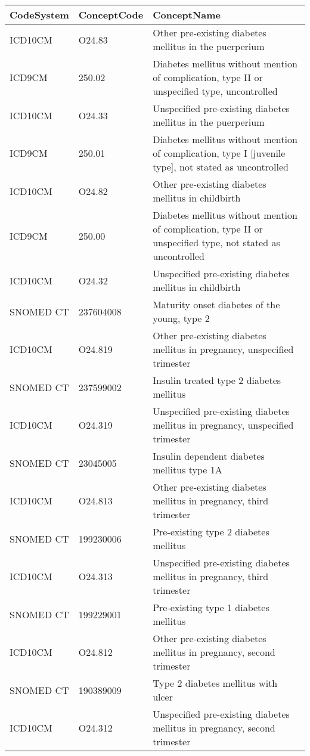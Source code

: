 \begin{table}[ht]
\centering
\begin{tabular}{lll}
  \hline
CodeSystem & ConceptCode & ConceptName \\ 
  \hline
ICD10CM & O24.83 & Other pre-existing diabetes mellitus in the puerperium \\ 
  ICD9CM & 250.02 & Diabetes mellitus without mention of complication, type II or unspecified type, uncontrolled \\ 
  ICD10CM & O24.33 & Unspecified pre-existing diabetes mellitus in the puerperium \\ 
  ICD9CM & 250.01 & Diabetes mellitus without mention of complication, type I [juvenile type], not stated as uncontrolled \\ 
  ICD10CM & O24.82 & Other pre-existing diabetes mellitus in childbirth \\ 
  ICD9CM & 250.00 & Diabetes mellitus without mention of complication, type II or unspecified type, not stated as uncontrolled \\ 
  ICD10CM & O24.32 & Unspecified pre-existing diabetes mellitus in childbirth \\ 
  SNOMED CT & 237604008 & Maturity onset diabetes of the young, type 2 \\ 
  ICD10CM & O24.819 & Other pre-existing diabetes mellitus in pregnancy, unspecified trimester \\ 
  SNOMED CT & 237599002 & Insulin treated type 2 diabetes mellitus \\ 
  ICD10CM & O24.319 & Unspecified pre-existing diabetes mellitus in pregnancy, unspecified trimester \\ 
  SNOMED CT & 23045005 & Insulin dependent diabetes mellitus type 1A \\ 
  ICD10CM & O24.813 & Other pre-existing diabetes mellitus in pregnancy, third trimester \\ 
  SNOMED CT & 199230006 & Pre-existing type 2 diabetes mellitus \\ 
  ICD10CM & O24.313 & Unspecified pre-existing diabetes mellitus in pregnancy, third trimester \\ 
  SNOMED CT & 199229001 & Pre-existing type 1 diabetes mellitus \\ 
  ICD10CM & O24.812 & Other pre-existing diabetes mellitus in pregnancy, second trimester \\ 
  SNOMED CT & 190389009 & Type 2 diabetes mellitus with ulcer \\ 
  ICD10CM & O24.312 & Unspecified pre-existing diabetes mellitus in pregnancy, second trimester \\ 

\end{tabular}
\end{table}
